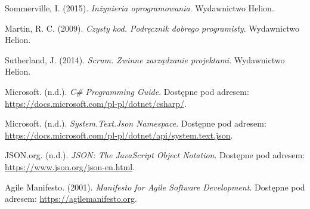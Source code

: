 \documentclass[polish,12pt,twoside,a4paper]{report}
\begin{document}




\newpage

\newpage

\newpage

\newpage

\newpage

\newpage

\newpage

\begin{thebibliography}{6}
 Sommerville, I. (2015). \textit{Inżynieria oprogramowania}. Wydawnictwo Helion.

 Martin, R. C. (2009). \textit{Czysty kod. Podręcznik dobrego programisty}. Wydawnictwo Helion.

 Sutherland, J. (2014). \textit{Scrum. Zwinne zarządzanie projektami}. Wydawnictwo Helion.

 Microsoft. (n.d.). \textit{C\# Programming Guide}. Dostępne pod adresem: \url{https://docs.microsoft.com/pl-pl/dotnet/csharp/}.

 Microsoft. (n.d.). \textit{System.Text.Json Namespace}. Dostępne pod adresem: \url{https://docs.microsoft.com/pl-pl/dotnet/api/system.text.json}.

 JSON.org. (n.d.). \textit{JSON: The JavaScript Object Notation}. Dostępne pod adresem: \url{https://www.json.org/json-en.html}.

 Agile Manifesto. (2001). \textit{Manifesto for Agile Software Development}. Dostępne pod adresem: \url{https://agilemanifesto.org}.

\end{thebibliography}
\newpage


\end{document}

